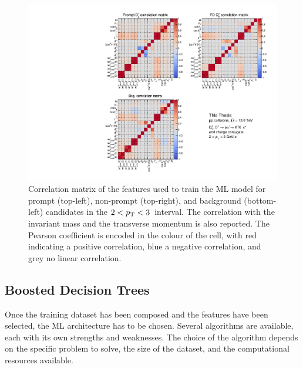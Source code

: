 \begin{figure}[p]
    \centering
    \includegraphics[width=\textwidth]{Figures/Chapter 5/CorrelationMatrix.pdf}
    \caption{Correlation matrix of the features used to train the ML model for prompt \ds (top-left), non-prompt \ds (top-right), and background (bottom-left) candidates in the $2<p_\mathrm{T}<3$~\gevc interval. The correlation with the invariant mass and the transverse momentum is also reported. The Pearson coefficient is encoded in the colour of the cell, with red indicating a positive correlation, blue a negative correlation, and grey no linear correlation.}
    \label{fig:ml_training_vars}
\end{figure}

\subsection{Boosted Decision Trees}
Once the training dataset has been composed and the features have been selected, the ML architecture has to be chosen. Several algorithms are available, each with its own strengths and weaknesses. The choice of the algorithm depends on the specific problem to solve, the size of the dataset, and the computational resources available. 

